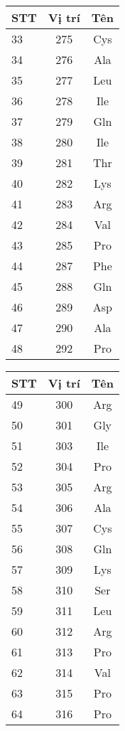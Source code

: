 \begin{multicols}{3}
\begin{tabular}{l|c c}
\hline
STT & Vị trí & Tên \\
\hline
33 & 275& Cys \\
34 & 276& Ala \\
35 & 277& Leu \\
36 & 278& Ile \\
37 & 279& Gln \\
38 & 280& Ile \\
39 & 281& Thr \\
40 & 282& Lys \\
41 & 283& Arg \\
42 & 284& Val \\
43 & 285& Pro \\
44 & 287& Phe \\
45 & 288& Gln \\
46 & 289& Asp \\
47 & 290& Ala \\
48 & 292& Pro \\
\end{tabular}

\begin{tabular}{l|c c}
\hline
STT & Vị trí & Tên \\
\hline
49 & 300& Arg \\
50 & 301& Gly \\
51 & 303& Ile \\
52 & 304& Pro \\
53 & 305& Arg \\
54 & 306& Ala \\
55 & 307& Cys \\
56 & 308& Gln \\
57 & 309& Lys \\
58 & 310& Ser \\
59 & 311& Leu \\
60 & 312& Arg \\
61 & 313& Pro \\
62 & 314& Val \\
63 & 315& Pro \\
64 & 316& Pro \\
\end{tabular}


\end{multicols}
